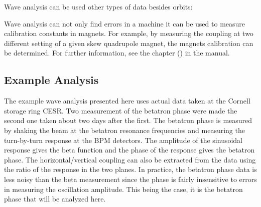 \documentclass{hitec}     %
\begin{document}
Wave analysis can be used other types of data besides orbits:
\begin{table}[h]
\caption[Wave measurement types.]
{Types of measurements that can be used in a wave analysis and the 
types of errors that can be diagnosed.}
\label{t:wave0}
\end{table}

Wave analysis can not only find errors in a machine it can be used to measure calibration constants
in magnets.  For example, by measuring the coupling at two different setting of a given skew
quadrupole magnet, the magnets calibration can be determined. For further information, see the
 chapter () in the \tao manual.

\subsection{Example Analysis}

The example wave analysis presented here uses actual data taken at the Cornell storage ring CESR.
Two measurement of the betatron phase were made the second one taken about two days after the first. 
The betatron phase is measured by shaking the beam at the betatron resonance frequencies and
measuring the turn-by-turn response at the BPM detectors\cite{b:phase.coupling.meas}. The amplitude
of the sinusoidal response gives the beta function and the phase of the response gives the betatron
phase. The horizontal/vertical coupling can also be extracted from the data using the ratio of the
response in the two planes. In practice, the betatron phase data is less noisy than the beta
measurement since the phase is fairly insensitive to errors in measuring the oscillation
amplitude. This being the case, it is the betatron phase that will be analyzed here.
\end{document}
